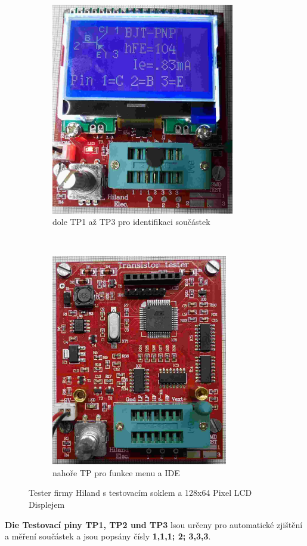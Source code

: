 \begin{figure}[H]
  \begin{subfigure}[b]{8.5cm}
    \centering
    \includegraphics[width=8cm]{../PNG/Hi_u.jpg}
    \caption{dole TP1 až TP3 pro identifikaci součástek}
  \end{subfigure}
  ~
  \begin{subfigure}[b]{9cm}
    \centering
    \includegraphics[width=7.7cm]{../PNG/Hi_o.jpg}
    \caption{nahoře TP pro funkce menu a IDE}
  \end{subfigure}
  \vspace{-0.2cm}
  \caption{Tester firmy Hiland s testovacím soklem a 128x64 Pixel LCD Displejem}
  \label{fig:Hiland}
\end{figure}

{\bf Die Testovací piny TP1, TP2 und TP3} lsou určeny pro automatické zjištění a měření součástek a jsou popsány čísly {\bf 1,1,1; 2; 3,3,3}.


